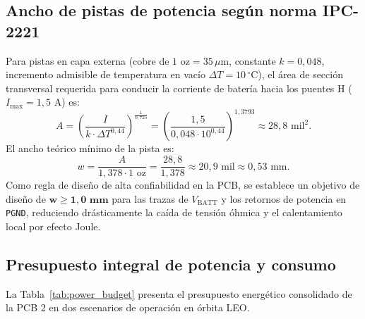\documentclass[11pt,a4paper]{article}
\begin{document}
\subsection{Ancho de pistas de potencia según norma IPC-2221}
Para pistas en capa externa (cobre de $1\text{ oz} = 35\,\mu\text{m}$, constante $k = 0{,}048$, incremento admisible de temperatura en vacío $\Delta T = 10\,^\circ\text{C}$), el área de sección transversal requerida para conducir la corriente de batería hacia los puentes H ($I_{\text{max}} = 1{,}5\text{ A}$) es:
\begin{equation}
A = \left( \frac{I}{k \cdot \Delta T^{0{,}44}} \right)^{\frac{1}{0{,}725}} = \left( \frac{1{,}5}{0{,}048 \cdot 10^{0{,}44}} \right)^{1{,}3793} \approx 28{,}8\text{ mil}^2.
\end{equation}
El ancho teórico mínimo de la pista es:
\begin{equation}
w = \frac{A}{1{,}378 \cdot 1\text{ oz}} = \frac{28{,}8}{1{,}378} \approx 20{,}9\text{ mil} \approx 0{,}53\text{ mm}.
\end{equation}
Como regla de diseño de alta confiabilidad en la PCB, se establece un objetivo de diseño de $\mathbf{w \ge 1{,}0\text{ mm}}$ para las trazas de $V_{\text{BATT}}$ y los retornos de potencia en \texttt{PGND}, reduciendo drásticamente la caída de tensión óhmica y el calentamiento local por efecto Joule.

\subsection{Presupuesto integral de potencia y consumo}
La Tabla~\ref{tab:power_budget} presenta el presupuesto energético consolidado de la PCB 2 en dos escenarios de operación en órbita LEO.
\end{document}
